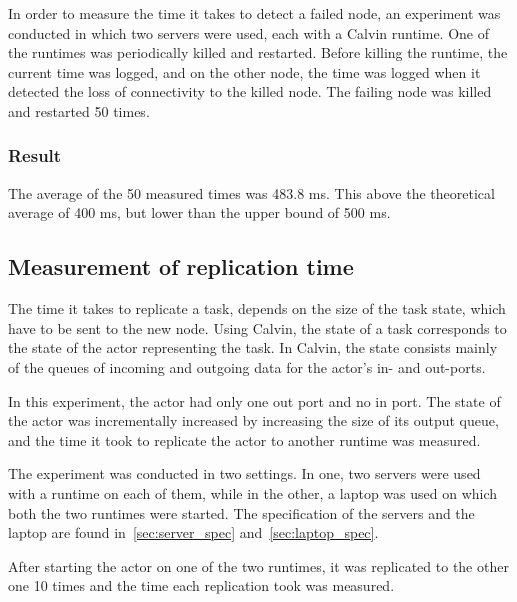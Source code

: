 \documentclass{cslthse-msc}
\begin{document}
In order to measure the time it takes to detect a failed node, an experiment was conducted in which two servers were used, each with a Calvin runtime. One of the runtimes was periodically killed and restarted. Before killing the runtime, the current time was logged, and on the other node, the time was logged when it detected the loss of connectivity to the killed node. The failing node was killed and restarted 50 times.

\subsubsection*{Result}
The average of the 50 measured times was 483.8 ms. This above the theoretical average of 400 ms, but lower than the upper bound of 500 ms.


\subsection{Measurement of replication time} \label{sec:eval_repl_time}
The time it takes to replicate a task, depends on the size of the task state, which have to be sent to the new node. Using Calvin, the state of a task corresponds to the state of the actor representing the task. In Calvin, the state consists mainly of the queues of incoming and outgoing data for the actor's in- and out-ports.

In this experiment, the actor had only one out port and no in port. The state of the actor was incrementally increased by increasing the size of its output queue, and the time it took to replicate the actor to another runtime was measured.

The experiment was conducted in two settings. In one, two servers were used with a runtime on each of them, while in the other, a laptop was used on which both the two runtimes were started. The specification of the servers and the laptop are found in~\cref{sec:server_spec} and~\cref{sec:laptop_spec}.

After starting the actor on one of the two runtimes, it was replicated to the other one 10 times and the time each replication took was measured. 
\end{document}
